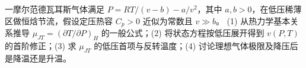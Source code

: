 一摩尔范德瓦耳斯气体满足 \(P=RT/(v-b)-a/v^2\)，其中 \(a,b>0\)，在低压稀薄区做恒焓节流，假设定压热容 \(C_p>0\) 近似为常数且 \(v\gg b\)。
(1) 从热力学基本关系推导 \(\mu_{JT}=(\partial T/\partial P)_H\) 的一般公式；(2) 将状态方程按低压展开得到 \(v(P,T)\) 的首阶修正；(3) 求 \(\mu_{JT}\) 的低压首项与反转温度；(4) 讨论理想气体极限及降压后是降温还是升温。
